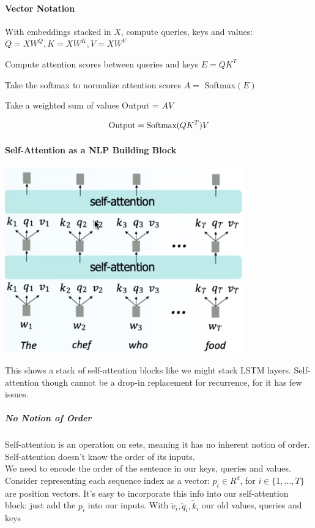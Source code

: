 \documentclass[10pt]{report}
\begin{document}
\paragraph{Vector Notation}
\begin{list}{}{}
	\item With embeddings stacked in $X$, compute queries, keys and values: $Q=XW^Q, K=XW^K, V=XW^V$
	\item Compute attention scores between queries and keys $E = QK^T$
	\item Take the softmax to normalize attention scores $A=$ Softmax$(E)$
	\item Take a weighted sum of values Output = $AV$
\end{list}
$$\hbox{Output}=\hbox{Softmax}(QK^T)V$$
\paragraph{Self-Attention as a NLP Building Block}
\begin{center}
	\includegraphics[scale=0.5]{68.png}
\end{center}
This shows a stack of self-attention blocks like we might stack LSTM layers. Self-attention though cannot be a drop-in replacement for recurrence, for it has few issues.
\subparagraph{No Notion of Order} Self-attention is an operation on sets, meaning it has no inherent notion of order. Self-attention doesn't know the order of its inputs.\\
We need to encode the order of the sentence in our keys, queries and values. Consider representing each sequence index as a vector: $p_i\in R^d$, for $i\in\{1,\ldots,T\}$ are position vectors. It's easy to incorporate this info into our self-attention block: just add the $p_i$ into our inputs. With $\tilde{v}_i, \tilde{q}_i, \tilde{k}_i$ our old values, queries and keys
\end{document}
